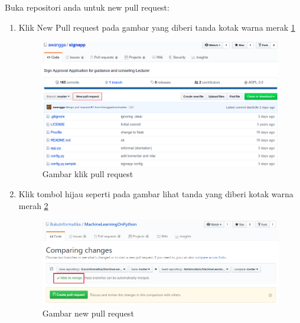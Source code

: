 Buka repositori anda untuk new pull request:
\begin{enumerate}
\item Klik New Pull request pada gambar yang diberi tanda kotak warna merak \ref{labelgambar1}
		\begin{figure}[H]
		\centering
		\includegraphics[width=1\textwidth]{figures/1.png}
		\caption{Gambar klik pull request}
		\label{labelgambar1}
		\end{figure}
\item Klik tombol hijau seperti pada gambar lihat tanda yang diberi kotak warna merah \ref{labelgambar2} 
		\begin{figure}[H]
		\centering
		\includegraphics[width=1\textwidth]{figures/2.PNG}
		\caption{Gambar new pull request}
		\label{labelgambar2}
		\end{figure}	 
\end{enumerate}